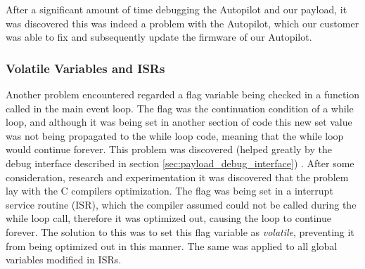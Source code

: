 After a significant amount of time debugging the Autopilot and our 
payload, it was discovered this was indeed a problem with the Autopilot, 
which our customer was able to fix and subsequently update the firmware 
of our Autopilot.

\subsubsection*{Volatile Variables and ISRs}

Another problem encountered regarded a flag variable being checked in a function called in the main event loop. The flag
was the continuation condition of a while loop, and although it was being set in another section of code this new set 
value was not being propagated to the while loop code, meaning that the while loop would continue forever. This problem
was discovered (helped greatly by the debug interface described in section \ref{sec:payload_debug_interface}) . After some
consideration, research and experimentation it was discovered that the problem lay with the C compilers optimization. The 
flag was being set in a interrupt service routine (ISR), which the compiler assumed could not be called during the while loop
call, therefore it was optimized out, causing the loop to continue forever. The solution to this was to set this flag variable 
as \emph{volatile}, preventing it from being optimized out in this manner. The same was applied to all global variables modified in ISRs.




